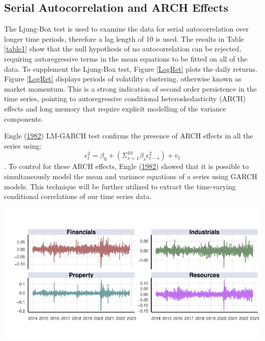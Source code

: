 \documentclass[11pt,preprint, authoryear]{elsarticle}
\let\origfigure\figure
\let\endorigfigure\endfigure
\renewenvironment{figure}[1][2] {
    \expandafter\origfigure\expandafter[H]
} {
    \endorigfigure
}
\numberwithin{equation}{section}
\numberwithin{figure}{section}
\numberwithin{table}{section}
\begin{document}
\hypertarget{serial-autocorrelation-and-arch-effects}{%
\subsection{Serial Autocorrelation and ARCH
Effects}\label{serial-autocorrelation-and-arch-effects}}

The Ljung-Box test is used to examine the data for serial
autocorrelation over longer time periods, therefore a lag length of 10
is used. The results in Table \ref{table1} show that the null hypothesis
of no autocorrelation can be rejected, requiring autoregressive terms in
the mean equations to be fitted on all of the data. To supplement the
Ljung-Box test, Figure \ref{LogRet} plots the daily returns. Figure
\ref{LogRet} displays periods of volatility clustering, otherwise known
as market momentum. This is a strong indication of second order
persistence in the time series, pointing to autoregressive conditional
heteroskedasticity (ARCH) effects and long memory that require explicit
modelling of the variance components.

Engle (\protect\hyperlink{ref-engle}{1982}) LM-GARCH test confirms the
presence of ARCH effects in all the series using:
\[\epsilon_t^2= \beta_0 + (\Sigma_{s = 1}^{10}\beta_s\epsilon_{t-s}^2) + v_t \].
To control for these ARCH effects, Engle
(\protect\hyperlink{ref-engle}{1982}) showed that it is possible to
simultaneously model the mean and variance equations of a series using
GARCH models. This technique will be further utilized to extract the
time-varying conditional correlations of our time series data.

\begin{figure}[H]

{\centering \includegraphics{Paper_files/figure-latex/LogRet-1} 

}

\caption{Log Returns per Sector for the SWIX \label{LogRet}}\label{fig:LogRet}
\end{figure}
\end{document}
